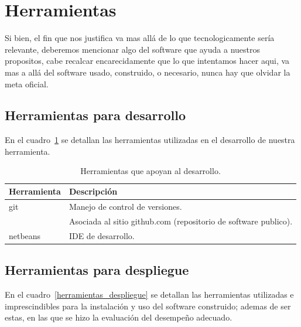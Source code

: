 \documentclass[letter,12pt]{article}
\begin{document}
\section{Herramientas}
Si bien, el fin que nos justifica va mas allá de lo que tecnologicamente sería relevante, deberemos mencionar algo del
software que ayuda a nuestros propositos, cabe recalcar encarecidamente que lo que intentamos hacer aqui, va mas a allá
del software usado, construido, o necesario, nunca hay que olvidar la meta oficial.

\subsection{Herramientas para desarrollo}
En el cuadro~\ref{herramientas_desarrollo} se detallan las herramientas utilizadas en el desarrollo de nuestra herramienta.

\begin{table}
\begin{tabular}{l|l}
Herramienta & Descripción \\
\hline
git & Manejo de control de versiones. \\
& Asociada al sitio github.com (repositorio de software publico). \\
netbeans & IDE de desarrollo. \\

\end{tabular}
\caption{Herramientas que apoyan al desarrollo.}
\label{herramientas_desarrollo}
\end{table}

\subsection{Herramientas para despliegue}
En el cuadro~\ref{herramientas_despliegue} se detallan las herramientas utilizadas e imprescindibles para la instalación
y uso del software construido; ademas de ser estas, en las que se hizo la evaluación del desempeño adecuado.
\end{document}
